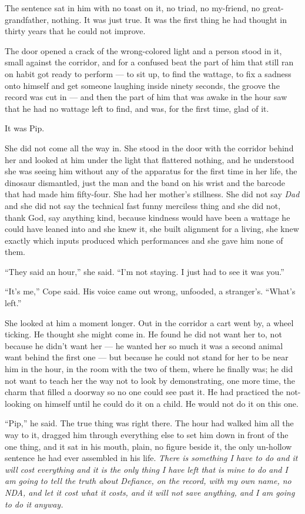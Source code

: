 \documentclass[11pt,openany]{book}
\newcommand{\scenebreak}{\par\vspace{0.5\baselineskip}\begin{center}\textasteriskcentered\quad\textasteriskcentered\quad\textasteriskcentered\end{center}\vspace{0.5\baselineskip}\par}
\begin{document}
The sentence sat in him with no toast on it, no triad, no my-friend, no great-grandfather, nothing. It was just true. It was the first thing he had thought in thirty years that he could not improve.


\scenebreak


The door opened a crack of the wrong-colored light and a person stood in it, small against the corridor, and for a confused beat the part of him that still ran on habit got ready to perform --- to sit up, to find the wattage, to fix a sadness onto himself and get someone laughing inside ninety seconds, the groove the record was cut in --- and then the part of him that was awake in the hour saw that he had no wattage left to find, and was, for the first time, glad of it.

It was Pip.

She did not come all the way in. She stood in the door with the corridor behind her and looked at him under the light that flattered nothing, and he understood she was seeing him without any of the apparatus for the first time in her life, the dinosaur dismantled, just the man and the band on his wrist and the barcode that had made him fifty-four. She had her mother's stillness. She did not say \textit{Dad} and she did not say the technical fast funny merciless thing and she did not, thank God, say anything kind, because kindness would have been a wattage he could have leaned into and she knew it, she built alignment for a living, she knew exactly which inputs produced which performances and she gave him none of them.

``They said an hour,'' she said. ``I'm not staying. I just had to see it was you.''

``It's me,'' Cope said. His voice came out wrong, unfooded, a stranger's. ``What's left.''

She looked at him a moment longer. Out in the corridor a cart went by, a wheel ticking. He thought she might come in. He found he did not want her to, not because he didn't want her --- he wanted her so much it was a second animal want behind the first one --- but because he could not stand for her to be near him in the hour, in the room with the two of them, where he finally was; he did not want to teach her the way not to look by demonstrating, one more time, the charm that filled a doorway so no one could see past it. He had practiced the not-looking on himself until he could do it on a child. He would not do it on this one.

``Pip,'' he said. The true thing was right there. The hour had walked him all the way to it, dragged him through everything else to set him down in front of the one thing, and it sat in his mouth, plain, no figure beside it, the only un-hollow sentence he had ever assembled in his life. \textit{There is something I have to do and it will cost everything and it is the only thing I have left that is mine to do and I am going to tell the truth about Defiance, on the record, with my own name, no NDA, and let it cost what it costs, and it will not save anything, and I am going to do it anyway.}
\end{document}
